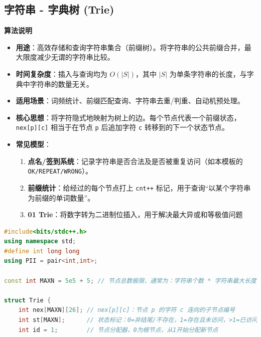\documentclass[10pt,landscape,a4paper]{article}
\begin{document}
\begin{multicols*}{3}
\subsection*{字符串 - 字典树 (Trie)}
\par\addvspace{0.7ex}\noindent\textbf{算法说明}\par\nobreak
\begin{itemize}
\item \textbf{用途}：高效存储和查询字符串集合（前缀树）。将字符串的公共前缀合并，最大限度减少无谓的字符串比较。
\item \textbf{时间复杂度}：插入与查询均为 $O(|S|)$，其中 $|S|$ 为单条字符串的长度，与字典中字符串的数量无关。
\item \textbf{适用场景}：词频统计、前缀匹配查询、字符串去重/判重、自动机预处理。
\item \textbf{核心思想}：将字符隐式地映射为树上的边。每个节点代表一个前缀状态，\texttt{n\allowbreak{}e\allowbreak{}x\allowbreak{}[\allowbreak{}p\allowbreak{}]\allowbreak{}[\allowbreak{}c\allowbreak{}]} 相当于在节点 \texttt{p} 后追加字符 \texttt{c} 转移到的下一个状态节点。
\item \textbf{常见模型}：
\begin{enumerate}[start=1]
\item \textbf{点名/签到系统}：记录字符串是否合法及是否被重复访问（如本模板的 \texttt{O\allowbreak{}K\allowbreak{}/\allowbreak{}R\allowbreak{}E\allowbreak{}P\allowbreak{}E\allowbreak{}A\allowbreak{}T\allowbreak{}/\allowbreak{}W\allowbreak{}R\allowbreak{}O\allowbreak{}N\allowbreak{}G}）。
\item \textbf{前缀统计}：给经过的每个节点打上 \texttt{c\allowbreak{}n\allowbreak{}t\allowbreak{}+\allowbreak{}+} 标记，用于查询“以某个字符串为前缀的单词数量”。
\item \textbf{01 Trie}：将数字转为二进制位插入，用于解决最大异或和等极值问题
\end{enumerate}
\end{itemize}
\par{}\par
\begin{lstlisting}[language=C++]
#include<bits/stdc++.h>
using namespace std;
#define int long long
using PII = pair<int,int>;

const int MAXN = 5e5 + 5; // 节点总数极限，通常为：字符串个数 * 字符串最大长度

struct Trie {
    int nex[MAXN][26]; // nex[p][c]：节点 p 的字符 c 连向的子节点编号
    int st[MAXN];      // 状态标记：0=非结尾/不存在，1=存在且未访问，>1=已访问
    int id = 1;        // 节点分配器，0为根节点，从1开始分配新节点


\end{lstlisting}
\end{multicols*}
\end{document}
